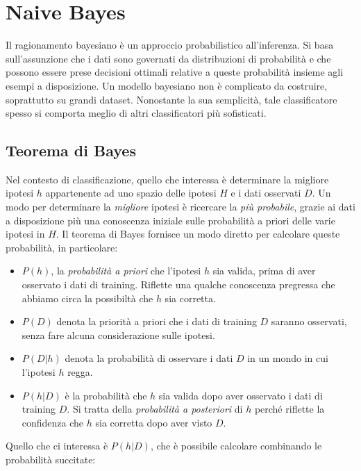 \chapter{Naive Bayes}
\label{ch:bayes}

Il ragionamento bayesiano è un approccio probabilistico all'inferenza. Si basa sull'assunzione che i dati sono governati da distribuzioni di probabilità e che possono essere prese decisioni ottimali relative a queste probabilità insieme agli esempi a disposizione. Un modello bayesiano non è complicato da costruire, soprattutto su grandi dataset. Nonostante la sua semplicità, tale classificatore spesso si comporta meglio di altri classificatori più sofisticati\cite{Domingos:1997:OSB:274158.274160}.

\section{Teorema di Bayes}
Nel contesto di classificazione, quello che interessa è determinare la migliore ipotesi $h$ appartenente ad uno spazio delle ipotesi $H$ e i dati osservati $D$. Un modo per determinare la \emph{migliore} ipotesi è ricercare la \emph{più probabile}, grazie ai dati a disposizione più una conoscenza iniziale sulle probabilità a priori delle varie ipotesi in $H$\cite{Mitchell:1997:ML:541177}. Il teorema di Bayes fornisce un modo diretto per calcolare queste probabilità, in particolare:

\begin{itemize}
	\item $P(h)$, la \emph{probabilità a priori} che l'ipotesi $h$ sia valida, prima di aver osservato i dati di training. Riflette una qualche conoscenza pregressa che abbiamo circa la possibiltà che $h$ sia corretta.
	\item $P(D)$ denota la priorità a priori che i dati di training $D$ saranno osservati, senza fare alcuna considerazione sulle ipotesi.
	\item $P(D|h)$ denota la probabilità di osservare i dati $D$ in un mondo in cui l'ipotesi $h$ regga.
	\item $P(h|D)$ è la probabilità che $h$ sia valida dopo aver osservato i dati di training $D$. Si tratta della \emph{probabilità a posteriori} di $h$ perché riflette la confidenza che $h$ sia corretta dopo aver visto $D$.
\end{itemize}

Quello che ci interessa è $P(h|D)$, che è possibile calcolare combinando le probabilità succitate:

